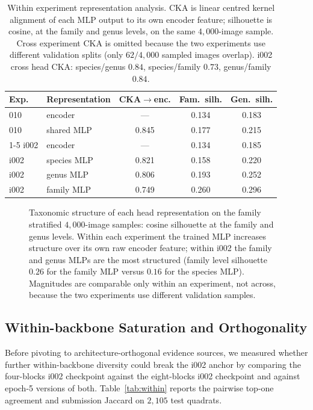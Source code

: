 \begin{table}[ht]
  \centering
  \small
  \setlength{\tabcolsep}{4pt}
  \begin{tabular}{@{}llccc@{}}
    \toprule
    Exp. & Representation & CKA$\to$enc. & Fam.\ silh. & Gen.\ silh. \\
    \midrule
    010  & encoder       & ---    & 0.134 & 0.183 \\
    010  & shared MLP    & 0.845  & 0.177 & 0.215 \\
    \cmidrule(lr){1-5}
    i002 & encoder       & ---    & 0.134 & 0.185 \\
    i002 & species MLP   & 0.821  & 0.158 & 0.220 \\
    i002 & genus MLP     & 0.806  & 0.193 & 0.252 \\
    i002 & family MLP    & 0.749  & 0.260 & 0.296 \\
    \bottomrule
  \end{tabular}
  \caption{Within experiment representation analysis. CKA is linear centred kernel alignment of each MLP output to its own encoder feature; silhouette is cosine, at the family and genus levels, on the same $4{,}000$-image sample. Cross experiment CKA is omitted because the two experiments use different validation splits (only $62/4{,}000$ sampled images overlap). i002 cross head CKA: species/genus $0.84$, species/family $0.73$, genus/family $0.84$.}
  \label{tab:head_repr}
\end{table}

\begin{figure}[!htbp]
  \centering
  
  \caption{Taxonomic structure of each head representation on the family stratified $4{,}000$-image samples: cosine silhouette at the family and genus levels. Within each experiment the trained MLP increases structure over its own raw encoder feature; within i002 the family and genus MLPs are the most structured (family level silhouette $0.26$ for the family MLP versus $0.16$ for the species MLP). Magnitudes are comparable only within an experiment, not across, because the two experiments use different validation samples.}
  \label{fig:head_taxstruct}
\end{figure}

\subsection{Within-backbone Saturation and Orthogonality}
\label{sec:orthogonality}

Before pivoting to architecture-orthogonal evidence sources, we measured whether further
within-backbone diversity could break the i002 anchor by comparing the four-blocks i002
checkpoint against the eight-blocks i002 checkpoint and against epoch-5 versions of both.
Table~\ref{tab:within} reports the pairwise top-one agreement and submission Jaccard on $2{,}105$
test quadrats.

